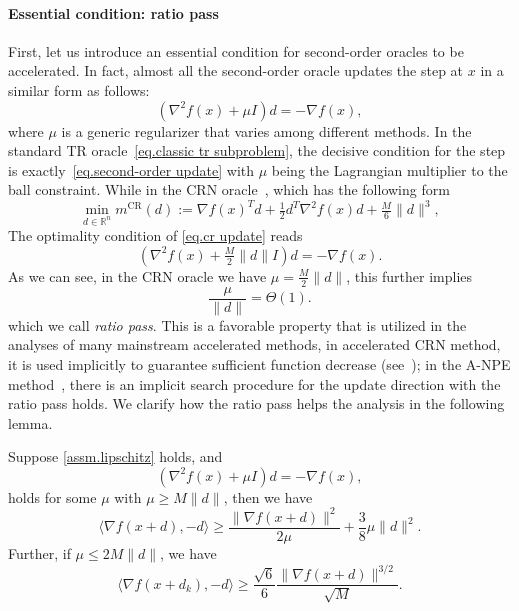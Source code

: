 \documentclass{article}
\begin{document}
\paragraph{Essential condition: ratio pass}
First, let us introduce an essential condition for second-order oracles to be accelerated. In fact, almost all the second-order oracle updates the step at $x$ in a similar form as follows:
\begin{equation}
    \label{eq.second-order update}
    \left (\nabla^2 f(x) + \mu I \right )d = -\nabla f(x),
\end{equation}
where $\mu$ is a generic regularizer that varies among different methods. In the standard TR oracle~\eqref{eq.classic tr subproblem}, the decisive condition for the step is exactly~\eqref{eq.second-order update} with $\mu$ being the Lagrangian multiplier to the ball constraint. While in the CRN oracle~\cite{nesterov2006cubic}, which has the following form
\begin{equation}
    \label{eq.cr update}
    \min_{d\in\mathbb{R}^n} m^{\text{CR}}(d):=\nabla f(x)^Td+\tfrac{1}{2}d^T\nabla^2 f(x)d+\tfrac{M}{6}\|d\|^3,
\end{equation}
The optimality condition of \eqref{eq.cr update} reads
\begin{equation}\label{eq.cropt}
    (\nabla^2 f(x) + \tfrac{M}{2}\|d\| I)d = -\nabla f(x).
\end{equation}
As we can see, in the CRN oracle we have $\mu = \frac{M}{2}\|d\|$, this further implies 
\begin{equation}
\frac{\mu}{\|d\|} = \Theta(1).
\end{equation}
which we call \textit{ratio pass}. This is a favorable property that is utilized in the analyses of many mainstream accelerated methods, in accelerated CRN method, it is used implicitly to guarantee sufficient function decrease (see~\citet[Lemma 4.2.5]{nesterov2008accelerating}); in the A-NPE method~\cite{monteiro2013accelerated}, there is an implicit search procedure for the update direction with the ratio pass holds. We clarify how the ratio pass helps the analysis in the following lemma.
\begin{lemma}
    \label{lem.inner product g and d}
    Suppose \autoref{assm.lipschitz} holds, and 
    \begin{equation}
        \label{eq.regularized condition for d}
        \left (\nabla^2 f(x)+\mu I\right)d = -\nabla f(x),
    \end{equation}
    holds for some $\mu$ with $\mu\geq M \|d\|$, then we have
    \begin{equation}
        \label{eq.inner product g d}
        \langle \nabla f(x+d),-d \rangle \geq \frac{\|\nabla f(x+d)\|^2}{2\mu}+\frac{3}{8}\mu \|d\|^2.
    \end{equation}
    Further, if $\mu \leq 2M\|d\|$, we have
    \begin{equation}
        \label{eq.inner product g d advanced}
        \langle \nabla f(x+d_k),-d \rangle \geq \frac{\sqrt{6}}{6} \frac{\|\nabla f(x+d)\|^{3/2}}{\sqrt{M}}.
    \end{equation}
\end{lemma}
\end{document}
